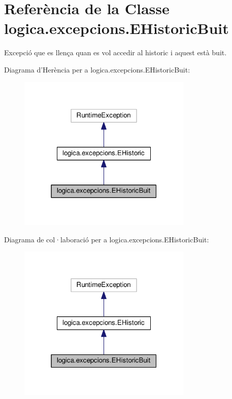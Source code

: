 \hypertarget{classlogica_1_1excepcions_1_1_e_historic_buit}{\section{Referència de la Classe logica.\+excepcions.\+E\+Historic\+Buit}
\label{classlogica_1_1excepcions_1_1_e_historic_buit}
}


Excepció que es llença quan es vol accedir al historic i aquest està buit.  




Diagrama d'Herència per a logica.\+excepcions.\+E\+Historic\+Buit\+:\nopagebreak
\begin{figure}[H]
\begin{center}
\leavevmode
\includegraphics[width=235pt]{classlogica_1_1excepcions_1_1_e_historic_buit__inherit__graph}
\end{center}
\end{figure}


Diagrama de col·laboració per a logica.\+excepcions.\+E\+Historic\+Buit\+:\nopagebreak
\begin{figure}[H]
\begin{center}
\leavevmode
\includegraphics[width=235pt]{classlogica_1_1excepcions_1_1_e_historic_buit__coll__graph}
\end{center}
\end{figure}
